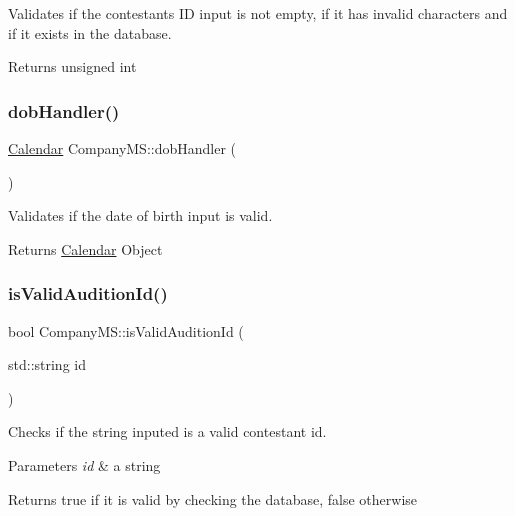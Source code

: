 Validates if the contestant\textquotesingle{}s ID input is not empty, if it has invalid characters and if it exists in the database. 

\begin{DoxyReturn}{Returns}
unsigned int 
\end{DoxyReturn}
\mbox{\label{class_company_m_s_a0018f0d192b4450e3203a581490e87ae}} 
\subsubsection{\texorpdfstring{dob\+Handler()}{dobHandler()}}
{\footnotesize\ttfamily \hyperlink{class_calendar}{Calendar} Company\+M\+S\+::dob\+Handler (\begin{DoxyParamCaption}{ }\end{DoxyParamCaption})}



Validates if the date of birth input is valid. 

\begin{DoxyReturn}{Returns}
\hyperlink{class_calendar}{Calendar} Object 
\end{DoxyReturn}
\mbox{\label{class_company_m_s_a7d66e2ba526b647b95362c1c7a7e6f48}} 
\subsubsection{\texorpdfstring{is\+Valid\+Audition\+Id()}{isValidAuditionId()}}
{\footnotesize\ttfamily bool Company\+M\+S\+::is\+Valid\+Audition\+Id (\begin{DoxyParamCaption}\item[{std\+::string}]{id }\end{DoxyParamCaption})}



Checks if the string inputed is a valid contestant id. 


\begin{DoxyParams}{Parameters}
{\em id} & a string \\
\hline
\end{DoxyParams}
\begin{DoxyReturn}{Returns}
true if it is valid by checking the database, false otherwise 
\end{DoxyReturn}
\mbox{\label{class_company_m_s_a2edd6d62bcef40920312bc967591a379}} 
